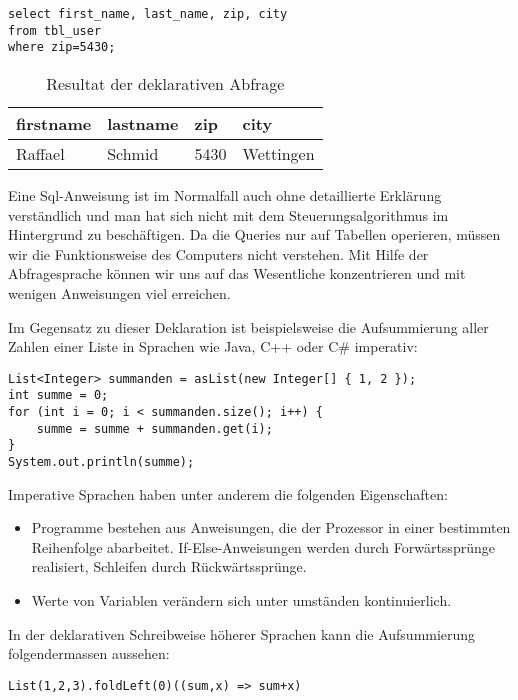 \begin{lstlisting}[caption=Sql Deklaration]
select first_name, last_name, zip, city 
from tbl_user 
where zip=5430;
\end{lstlisting}


  \begin{longtable}{|p{2cm}|p{2cm}|p{2cm}|p{2cm}|}
    \caption{Resultat der deklarativen Abfrage}\\
\hline
  firstname & lastname & zip & city\\
  \hline
    Raffael & Schmid & 5430 & Wettingen\\
  \hline
  \end{longtable}

Eine Sql-Anweisung ist im Normalfall auch ohne detaillierte Erkl\"arung verst\"andlich und man hat sich nicht mit dem Steuerungsalgorithmus im Hintergrund zu besch\"aftigen. Da die Queries nur auf Tabellen operieren, m\"ussen wir die Funktionsweise des Computers nicht verstehen. Mit Hilfe der Abfragesprache k\"onnen wir uns auf das Wesentliche konzentrieren und mit wenigen Anweisungen viel erreichen. \cite{Piepmeyer201006}

Im Gegensatz zu dieser Deklaration ist beispielsweise die Aufsummierung aller Zahlen einer Liste in Sprachen wie Java, C++ oder C\# imperativ:

\begin{lstlisting}[caption=Summe einer Liste in Java]
List<Integer> summanden = asList(new Integer[] { 1, 2 });
int summe = 0;
for (int i = 0; i < summanden.size(); i++) {
	summe = summe + summanden.get(i);
}
System.out.println(summe);
\end{lstlisting}

Imperative Sprachen haben unter anderem die folgenden Eigenschaften:
\begin{itemize}
\item Programme bestehen aus Anweisungen, die der Prozessor in einer bestimmten Reihenfolge abarbeitet. If-Else-Anweisungen werden durch Forw\"artsspr\"unge realisiert, Schleifen durch R\"uckw\"artsspr\"unge.
\item Werte von Variablen ver\"andern sich unter umst\"anden kontinuierlich.
\end{itemize}

In der deklarativen Schreibweise h\"oherer Sprachen kann die Aufsummierung folgendermassen aussehen:
\begin{lstlisting}[caption=Summe einer Liste in Scala]
List(1,2,3).foldLeft(0)((sum,x) => sum+x)
\end{lstlisting} 

